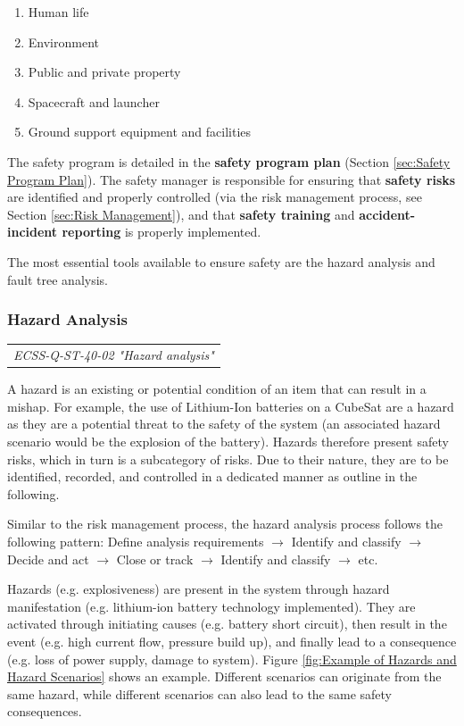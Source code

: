 \begin{enumerate}
\item Human life
\item Environment
\item Public and private property
\item Spacecraft and launcher
\item Ground support equipment and facilities
\end{enumerate}

The safety program is detailed in the \textbf{safety program plan} (Section \ref{sec:Safety Program Plan}). The safety manager is responsible for ensuring that \textbf{safety risks} are identified and properly controlled (via the risk management process, see Section \ref{sec:Risk Management}), and that \textbf{safety training} and \textbf{accident-incident reporting} is properly implemented.  

The most essential tools available to ensure safety are the hazard analysis and fault tree analysis.

\subsubsection{Hazard Analysis}

\begin{tabular}{l}
\textit{ECSS-Q-ST-40-02 "Hazard analysis" \cite{ECSS-Q-ST-40-02}}
\end{tabular}

A hazard is an existing or potential condition of an item that can result in a mishap. For example, the use of Lithium-Ion batteries on a CubeSat are a hazard as they are a potential threat to the safety of the system (an associated hazard scenario would be the explosion of the battery). Hazards therefore present safety risks, which in turn is a subcategory of risks. Due to their nature, they are to be identified, recorded, and controlled in a dedicated manner as outline in the following.

Similar to the risk management process, the hazard analysis process follows the following pattern:
Define analysis requirements
$\rightarrow$ Identify and classify
$\rightarrow$ Decide and act
$\rightarrow$ Close or track
$\rightarrow$ Identify and classify
$\rightarrow$ etc.

Hazards (e.g. explosiveness) are present in the system through hazard manifestation (e.g. lithium-ion battery technology implemented). They are activated through initiating causes (e.g. battery short circuit), then result in the event (e.g. high current flow, pressure build up), and finally lead to a consequence (e.g. loss of power supply, damage to system). Figure \ref{fig:Example of Hazards and Hazard Scenarios} shows an example. Different scenarios can originate from the same hazard, while different scenarios can also lead to the same safety consequences.

